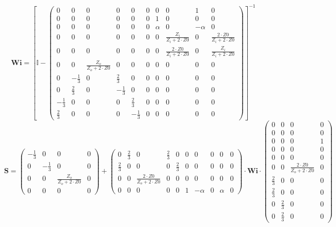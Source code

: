 \[ \mathbf{Wi} =  \left[ \mathbb{I}  - \left(\begin{smallmatrix} 0 & 0
& 0 & 0 & 0 & 0 & 0 & 0 & 1 & 0 \\ 0 & 0 & 0 & 0 & 0 & 0 & 1 & 0 & 0 &
0 \\ 0 & 0 & 0 & 0 & 0 & 0 & \alpha & 0 & -\alpha & 0 \\ 0 & 0 & 0 & 0
& 0 & 0 & 0 & \frac{Z_i}{Z_i+2\cdot Z0} & 0 & \frac{2\cdot
Z0}{Z_i+2\cdot Z0} \\ 0 & 0 & 0 & 0 & 0 & 0 & 0 & \frac{2\cdot
Z0}{Z_i+2\cdot Z0} & 0 & \frac{Z_i}{Z_i+2\cdot Z0} \\ 0 & 0 &
\frac{Z_o}{Z_o+2\cdot Z0} & 0 & 0 & 0 & 0 & 0 & 0 & 0 \\ 0 &
-\frac{1}{3} & 0 & \frac{2}{3} & 0 & 0 & 0 & 0 & 0 & 0 \\ 0 &
\frac{2}{3} & 0 & -\frac{1}{3} & 0 & 0 & 0 & 0 & 0 & 0 \\ -\frac{1}{3}
& 0 & 0 & 0 & \frac{2}{3} & 0 & 0 & 0 & 0 & 0 \\ \frac{2}{3} & 0 & 0 &
0 & -\frac{1}{3} & 0 & 0 & 0 & 0 & 0 \end{smallmatrix}\right)
\right]^{-1}  \]
\[ \mathbf{S} = \left(\begin{smallmatrix} -\frac{1}{3} & 0 & 0 & 0 \\
0 & -\frac{1}{3} & 0 & 0 \\ 0 & 0 & \frac{Z_o}{Z_o+2\cdot Z0} & 0 \\ 0
& 0 & 0 & 0 \end{smallmatrix}\right) + \left(\begin{smallmatrix} 0 &
\frac{2}{3} & 0 & \frac{2}{3} & 0 & 0 & 0 & 0 & 0 & 0 \\ \frac{2}{3} &
0 & 0 & 0 & \frac{2}{3} & 0 & 0 & 0 & 0 & 0 \\ 0 & 0 & \frac{2\cdot
Z0}{Z_o+2\cdot Z0} & 0 & 0 & 0 & 0 & 0 & 0 & 0 \\ 0 & 0 & 0 & 0 & 0 &
1 & -\alpha & 0 & \alpha & 0 \end{smallmatrix}\right) \cdot
\mathbf{Wi} \cdot\left(\begin{smallmatrix} 0 & 0 & 0 & 0 \\ 0 & 0 & 0
& 0 \\ 0 & 0 & 0 & 1 \\ 0 & 0 & 0 & 0 \\ 0 & 0 & 0 & 0 \\ 0 & 0 &
\frac{2\cdot Z0}{Z_o+2\cdot Z0} & 0 \\ \frac{2}{3} & 0 & 0 & 0 \\
\frac{2}{3} & 0 & 0 & 0 \\ 0 & \frac{2}{3} & 0 & 0 \\ 0 & \frac{2}{3}
& 0 & 0 \end{smallmatrix}\right) \]
